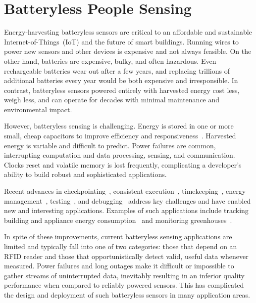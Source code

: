 \section{Batteryless People Sensing}
\label{sec:background}

Energy-harvesting batteryless sensors are critical to an affordable and sustainable Internet-of-Things~(IoT) and the future of smart buildings.
%
Running wires to power new sensors and other devices is expensive and not always feasible.
On the other hand, batteries are expensive, bulky, and often hazardous.
Even rechargeable batteries wear out after a few years, and replacing trillions of additional batteries every year would be both expensive and irresponsible.
%
In contrast, batteryless sensors powered entirely with harvested energy cost less, weigh less, and can operate for decades with minimal maintenance and environmental impact.

However, batteryless sensing is challenging.
Energy is stored in one or more small, cheap capacitors to improve efficiency and responsiveness~\cite{jhester:ufop:sensys}.
Harvested energy is variable and difficult to predict.
Power failures are common, interrupting computation and data processing, sensing, and communication.
Clocks reset and volatile memory is lost frequently, complicating a developer's ability to build robust and sophisticated applications.

Recent advances in checkpointing~\cite{ransford2011mementos, balsamo2015hibernus}, consistent execution~\cite{colin2016chain, Lucia:2015:Dino}, timekeeping~\cite{hester2016persistent}, energy management~\cite{jhester:ufop:sensys}, testing~\cite{ekho-sensys}, and debugging~\cite{colin_edb} address key challenges and have enabled new and interesting applications. Examples of such applications include  tracking building and appliance energy consumption~\cite{debruin2013monjolo,campbell2014energy} and monitoring greenhouses~\cite{jhester:ufop:sensys}.


In spite of these improvements, current batteryless sensing applications are limited and typically fall into one of two categories: those that depend on an RFID reader and those that opportunistically detect valid, useful data whenever measured.
Power failures and long outages make it difficult or impossible to gather streams of uninterrupted data, inevitably resulting in an inferior quality performance when compared to reliably powered sensors.
This has complicated the design and deployment of such batteryless sensors in many application areas.

